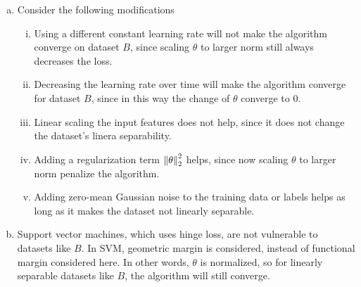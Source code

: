 \documentclass[12pt,letterpaper,boxed]{hmcpset}
\begin{document}
\begin{solution}
\begin{enumerate}[(a)]
    \item Consider the following modifications
    \begin{enumerate}[i.]
      \item Using a different constant learning rate will not make the algorithm converge on dataset $B$, since scaling $\theta$ to larger norm still always decreases the loss.
      \item Decreasing the learning rate over time will make the algorithm converge for dataset $B$, since in this way the change of $\theta$ converge to $0$.
      \item Linear scaling the input features does not help, since it does not change the dataset's linera separability.
      \item Adding a regularization term $\left\lVert \theta\right\rVert_2^2$ helps, since now scaling $\theta$ to larger norm penalize the algorithm.
      \item Adding zero-mean Gaussian noise to the training data or labels helps as long as it makes the dataset not linearly separable.
    \end{enumerate}
    
    \item Support vector machines, which uses hinge loss, are not vulnerable to datasets like $B$. In SVM, geometric margin is considered, instead of functional margin considered here. In other words, $\theta$ is normalized, so for linearly separable datasets like $B$, the algorithm will still converge.
  \end{enumerate}
\end{solution}
\end{document}
